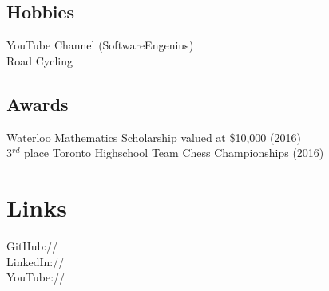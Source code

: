 \documentclass[]{deedy-resume-openfont}
\begin{document}
\begin{minipage}[t]{0.33\textwidth}
\subsection{Hobbies}
\textbullet{} YouTube Channel (SoftwareEngenius)\\
\textbullet{} Road Cycling\\

\vspace{2mm}

\subsection{Awards}


\textbullet{} Waterloo Mathematics Scholarship valued at \$10,000 (2016) \\
\textbullet{} 3$^{rd}$ place Toronto Highschool Team Chess Championships (2016) \\

\vspace{1mm}


\section{Links} 
GitHub:// \href{https://github.com/MathBunny}{} \\
LinkedIn://  \href{https://www.linkedin.com/in/horatiulazu}{} \\
YouTube://  \href{https://www.youtube.com/user/SoftwareEngenius}{} \\
\sectionsep

%
%

\end{minipage} 
\end{document}
